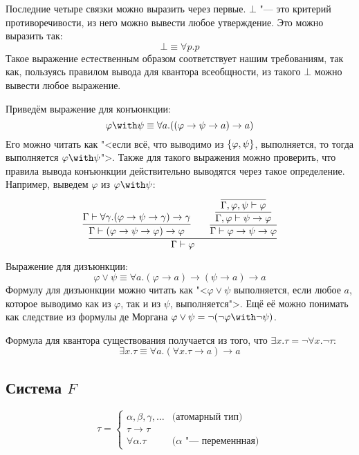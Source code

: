 Последние четыре связки можно выразить через первые.
$\bot$ "--- это критерий противоречивости,
из него можно вывести любое утверждение. Это можно выразить так:
\[
    \bot \equiv \forall p . p
\]
Такое выражение естественным образом соответствует нашим требованиям,
так как, пользуясь правилом вывода для квантора всеобщности, из такого $\bot$ можно вывести любое выражение.

Приведём выражение для конъюнкции:
\[
    \varphi \with \psi \equiv \forall a . ((\varphi \to \psi \to a) \to a)
\]
Его можно читать как "<если всё, что выводимо из $\left\{\varphi,\psi\right\}$, выполняется,
то тогда выполняется $\varphi\with\psi$">.
Также для такого выражения можно проверить, что правила вывода конъюнкции действительно выводятся через такое определение.
Например, выведем $\varphi$ из $\varphi\with\psi$:
\[
    \infer{\Gamma \vdash \varphi}
    {
        \infer{\Gamma \vdash (\varphi\to\psi\to\varphi)\to\varphi}
            {\Gamma \vdash \forall \gamma.(\varphi\to\psi\to\gamma)\to\gamma}
        &&
        \infer{\Gamma\vdash\varphi\to\psi\to\varphi}
        {\infer{\Gamma,\varphi\vdash\psi\to\varphi}
        {\infer{\Gamma,\varphi,\psi\vdash\varphi}
        {}}}
    }
\]

Выражение для дизъюнкции:
\[
    \varphi \vee \psi \equiv \forall a . (\varphi \to a) \to (\psi \to a) \to a
\]
Формулу для дизъюнкции можно читать как "<$\varphi \vee \psi$ выполняется,
если любое $a$, которое выводимо как из $\varphi$, так и из $\psi$, выполняется">.
Ещё её можно понимать как следствие из формулы де Моргана $\varphi\vee\psi=\neg(\neg\varphi\with\neg\psi)$.

Формула для квантора существования получается из того, что $\exists x . \tau = \neg \forall x . \neg \tau$:
\[
    \exists x . \tau \equiv \forall a . (\forall x . \tau \to a) \to a
\]

\subsection{\texorpdfstring{Система $F$}{System F}}
\begin{definition}
\[
    \tau =
    \begin{cases}
        \alpha, \beta, \gamma, \ldots & \text{(атомарный тип)} \\
        \tau \to \tau \\
        \forall \alpha . \tau & \text{($\alpha$ "--- переменнная)}
    \end{cases}
\]
\end{definition}

